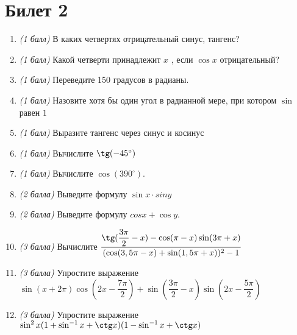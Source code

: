 \documentclass[12pt, a4paper]{article}
\begin{document}
	\section*{Билет 2}
	\begin{enumerate}
		\item \textit{(1 балл)}	В каких четвертях отрицательный синус, тангенс? 
		\item \textit{(1 балл)}	Какой четверти принадлежит $x$ , если $\cos x$ отрицательный?
		\item \textit{(1 балл)}	Переведите 150 градусов в радианы.
		\item \textit{(1 балл)}	Назовите хотя бы один угол в радианной мере, при котором $\sin$  равен $1$
		\item \textit{(1 балл)} Выразите тангенс через синус и косинус
		\item \textit{(1 балл)} Вычислите $\tg (-45^{\circ})$
		\item \textit{(1 балл)}	Вычислите $\cos (390^{\circ})$.
		\item \textit{(2 балла)} Выведите формулу $\sin x \cdot sin y$ 
		\item \textit{(2 балла)} Выведите формулу $cos x + \cos y$.
		\item \textit{(3 балла)} Вычислите $\dfrac{\tg(\dfrac{3\pi}{2}-x)-\cos (\pi-x) \sin (3\pi + x)}{(\cos (3,5\pi - x) + \sin (1,5\pi + x))^2-1}$
		\item \textit{(3 балла)} Упростите выражение $\sin(x+2\pi) \cos (2x-\dfrac{7\pi}{2}) + \sin (\dfrac{3\pi}{2}-x) \sin (2x-\dfrac{5\pi}{2})$
		\item \textit{(3 балла)} Упростите выражение $\sin^2 x(1+\sin^{-1}x + \ctg x)(1 - \sin^{-1}x + \ctg x)$
	\end{enumerate}
	
	\newpage 
	
\end{document}

